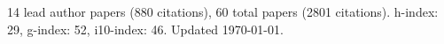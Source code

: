 14 lead author papers (880 citations),
60 total papers (2801 citations).\newline
h-index: 29, g-index: 52, i10-index: 46. Updated \today.